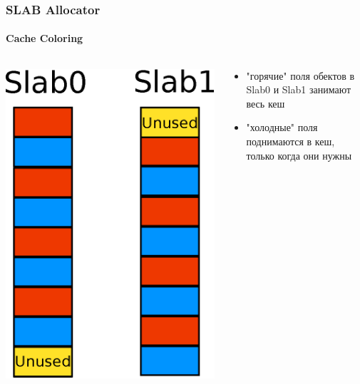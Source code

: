 \begin{frame}
\frametitle{SLAB Allocator}
\framesubtitle{Cache Coloring}

\begin{columns}[T]

  \begin{column}{.3\textwidth}
    \includegraphics[width=\linewidth]{slab-color1}
  \end{column}

  \begin{column}{.7\textwidth}
    \begin{itemize}
      \item "горячие" поля обектов в Slab0 и Slab1 занимают весь кеш
      \item "холодные" поля поднимаются в кеш, только когда они нужны
    \end{itemize}
  \end{column}

\end{columns}

\end{frame}

